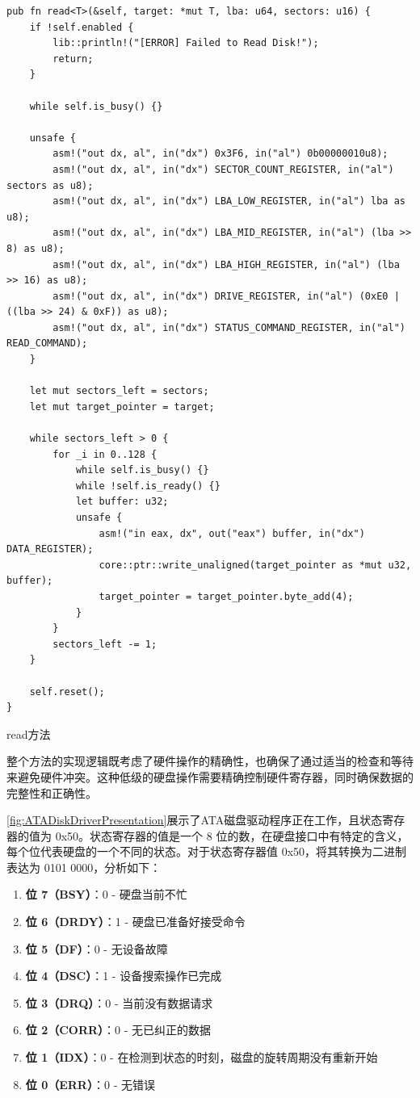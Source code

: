 \begin{listing}[htbp]
    \begin{verbatim}
pub fn read<T>(&self, target: *mut T, lba: u64, sectors: u16) {
    if !self.enabled {
        lib::println!("[ERROR] Failed to Read Disk!");
        return;
    }

    while self.is_busy() {}

    unsafe {
        asm!("out dx, al", in("dx") 0x3F6, in("al") 0b00000010u8);
        asm!("out dx, al", in("dx") SECTOR_COUNT_REGISTER, in("al") sectors as u8);
        asm!("out dx, al", in("dx") LBA_LOW_REGISTER, in("al") lba as u8);
        asm!("out dx, al", in("dx") LBA_MID_REGISTER, in("al") (lba >> 8) as u8);
        asm!("out dx, al", in("dx") LBA_HIGH_REGISTER, in("al") (lba >> 16) as u8);
        asm!("out dx, al", in("dx") DRIVE_REGISTER, in("al") (0xE0 | ((lba >> 24) & 0xF)) as u8);
        asm!("out dx, al", in("dx") STATUS_COMMAND_REGISTER, in("al") READ_COMMAND);
    }

    let mut sectors_left = sectors;
    let mut target_pointer = target;

    while sectors_left > 0 {
        for _i in 0..128 {
            while self.is_busy() {}
            while !self.is_ready() {}
            let buffer: u32;
            unsafe {
                asm!("in eax, dx", out("eax") buffer, in("dx") DATA_REGISTER);
                core::ptr::write_unaligned(target_pointer as *mut u32, buffer);
                target_pointer = target_pointer.byte_add(4);
            }
        }
        sectors_left -= 1;
    }

    self.reset();
}
    \end{verbatim}
    \caption{read方法}\label{lst:ReadMethod}
\end{listing}

整个方法的实现逻辑既考虑了硬件操作的精确性，也确保了通过适当的检查和等待来避免硬件冲突。这种低级的硬盘操作需要精确控制硬件寄存器，同时确保数据的完整性和正确性。

\cref{fig:ATADiskDriverPresentation}展示了ATA磁盘驱动程序正在工作，且状态寄存器的值为 0x50。状态寄存器的值是一个 8 位的数，在硬盘接口中有特定的含义，每个位代表硬盘的一个不同的状态。对于状态寄存器值 0x50，将其转换为二进制表达为 0101 0000，分析如下：

\begin{enumerate}
    \item \textbf{位 7（BSY）}：0 - 硬盘当前不忙
    \item \textbf{位 6（DRDY）}：1 - 硬盘已准备好接受命令
    \item \textbf{位 5（DF）}：0 - 无设备故障
    \item \textbf{位 4（DSC）}：1 - 设备搜索操作已完成
    \item \textbf{位 3（DRQ）}：0 - 当前没有数据请求
    \item \textbf{位 2（CORR）}：0 - 无已纠正的数据
    \item \textbf{位 1（IDX）}：0 - 在检测到状态的时刻，磁盘的旋转周期没有重新开始
    \item \textbf{位 0（ERR）}：0 - 无错误
\end{enumerate}

